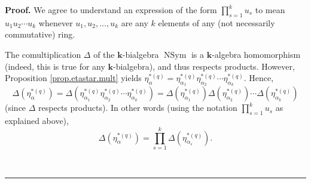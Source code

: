 \documentclass[numbers=enddot,12pt,final,onecolumn,notitlepage]{scrartcl}%
\theoremstyle{definition}
\newenvironment{proof}[1][Proof]{\noindent\textbf{#1.} }{\ \rule{0.5em}{0.5em}}
\let\prodnonlimits\prod
\renewcommand{\prod}{\prodnonlimits\limits}
\begin{document}
\begin{proof}
We agree to understand an expression of the form $\prod_{s=1}^{k}u_{s}$ to
mean $u_{1}u_{2}\cdots u_{k}$ whenever $u_{1},u_{2},\ldots,u_{k}$ are any $k$
elements of any (not necessarily commutative) ring.

The comultiplication $\Delta$ of the $\mathbf{k}$-bialgebra
$\operatorname*{NSym}$ is a $\mathbf{k}$-algebra homomorphism (indeed, this is
true for any $\mathbf{k}$-bialgebra), and thus respects products. However,
Proposition \ref{prop.etastar.mult} yields $\eta_{\alpha}^{\ast\left(
q\right)  }=\eta_{\alpha_{1}}^{\ast\left(  q\right)  }\eta_{\alpha_{2}}%
^{\ast\left(  q\right)  }\cdots\eta_{\alpha_{k}}^{\ast\left(  q\right)  }$.
Hence,%
\[
\Delta\left(  \eta_{\alpha}^{\ast\left(  q\right)  }\right)  =\Delta\left(
\eta_{\alpha_{1}}^{\ast\left(  q\right)  }\eta_{\alpha_{2}}^{\ast\left(
q\right)  }\cdots\eta_{\alpha_{k}}^{\ast\left(  q\right)  }\right)
=\Delta\left(  \eta_{\alpha_{1}}^{\ast\left(  q\right)  }\right)
\Delta\left(  \eta_{\alpha_{2}}^{\ast\left(  q\right)  }\right)  \cdots
\Delta\left(  \eta_{\alpha_{k}}^{\ast\left(  q\right)  }\right)
\]
(since $\Delta$ respects products). In other words (using the notation
$\prod_{s=1}^{k}u_{s}$ as explained above),%
\begin{equation}
\Delta\left(  \eta_{\alpha}^{\ast\left(  q\right)  }\right)  =\prod_{s=1}%
^{k}\Delta\left(  \eta_{\alpha_{s}}^{\ast\left(  q\right)  }\right)  .
\label{pf.cor.Deltaetastaral.1}%
\end{equation}



\end{proof}
\end{document}
